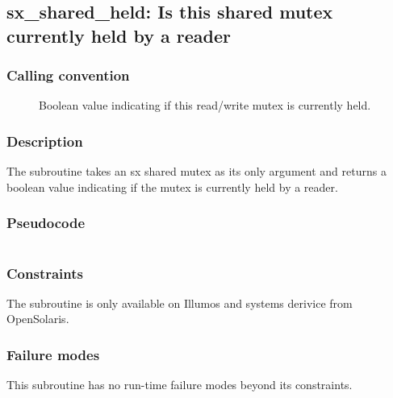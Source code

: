 \clearpage
{}
{}
\label{insn:dummy}
\subsection*{sx\_shared\_held: Is this shared mutex currently held by
  a reader}

\subsubsection*{Calling convention}

\begin{description}
\item[] Boolean value indicating if this read/write
  mutex is currently held.
\end{description}

\subsubsection*{Description}

The  subroutine takes an sx shared mutex as
its only argument and returns a boolean value indicating if the mutex
is currently held by a reader.

\subsubsection*{Pseudocode}

\begin{verbatim}
\end{verbatim}

\subsubsection*{Constraints}

The  subroutine is only available on Illumos and
systems derivice from OpenSolaris.

\subsubsection*{Failure modes}

This subroutine has no run-time failure modes beyond its constraints.
